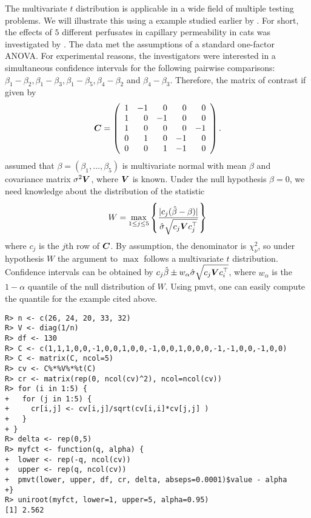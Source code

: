 \documentclass[11pt]{amsart}
\newcommand{\C}{\mbox{\boldmath $C$}}
\newcommand{\V}{\mbox{\boldmath $V$}}
\begin{document}
The multivariate $t$ distribution is applicable in a wide field of multiple
testing problems. We will illustrate this using a example studied
earlier by \cite{the-effici:1987}. For short, the 
effects of $5$ different perfusates in 
capillary permeability in cats was investigated by 
\cite{blood-and-:1987}. The data met the assumptions of a
standard one-factor ANOVA. For experimental reasons, the investigators were
interested in a simultaneous confidence intervals for the following pairwise
comparisons: $ \beta_1 - \beta_2, \beta_1 - \beta_3, \beta_1 - \beta_5,
\beta_4 - \beta_2 $ and $ \beta_4 - \beta_3 $. Therefore, the matrix of
contrast if given by 
\begin{eqnarray*}
\C = \left( \begin{array}{rrrrr} 1 & -1 & 0 & 0 & 0 \\
1 & 0 & -1 & 0 & 0 \\
1 & 0 & 0 & 0 & -1 \\
0 & 1 & 0 & -1 & 0 \\
0 & 0 & 1 & -1 & 0 \end{array} \right) .
\end{eqnarray*}
\cite{the-effici:1987} assumed that $ \beta = (\beta_1, \dots, \beta_5) $ is
multivariate normal with mean $ \beta $ and covariance matrix $ \sigma^2 \V
$, where $ \V $ is known. Under the null hypothesis $ \beta = 0 $, we need 
knowledge about the
distribution of the statistic
\begin{eqnarray*}
W = \max_{1 \le j \le 5} \left\{ \frac{| c_j(\hat{\beta} - \beta)
|}{\hat{\sigma}\sqrt{c_j \V c_j^{\top}}} \right\}
\end{eqnarray*}
where $ c_j $ is the $j$th row of $ \C $.
By assumption, the denominator is $ \chi^2_\nu $, so under hypothesis $ W $
the argument to $ \max $ follows a multivariate $ t $ distribution.
Confidence intervals can be obtained by $ c_j \hat{\beta} \pm w_\alpha
\hat{\sigma} \sqrt{c_j \V c_i^\top} $, where $ w_\alpha $ is the $ 1 - \alpha
$ quantile of the null distribution of $ W $. Using {\ttfamily pmvt}, one
can easily compute the quantile for the example cited above.

\begin{verbatim}
R> n <- c(26, 24, 20, 33, 32)
R> V <- diag(1/n)
R> df <- 130
R> C <- c(1,1,1,0,0,-1,0,0,1,0,0,-1,0,0,1,0,0,0,-1,-1,0,0,-1,0,0)
R> C <- matrix(C, ncol=5)
R> cv <- C%*%V%*%t(C)
R> cr <- matrix(rep(0, ncol(cv)^2), ncol=ncol(cv))
R> for (i in 1:5) {
+   for (j in 1:5) {
+     cr[i,j] <- cv[i,j]/sqrt(cv[i,i]*cv[j,j] )
+   }
+ }
R> delta <- rep(0,5)
R> myfct <- function(q, alpha) {
+  lower <- rep(-q, ncol(cv))
+  upper <- rep(q, ncol(cv))
+  pmvt(lower, upper, df, cr, delta, abseps=0.0001)$value - alpha
+}
R> uniroot(myfct, lower=1, upper=5, alpha=0.95)
[1] 2.562
\end{verbatim}
\end{document}
